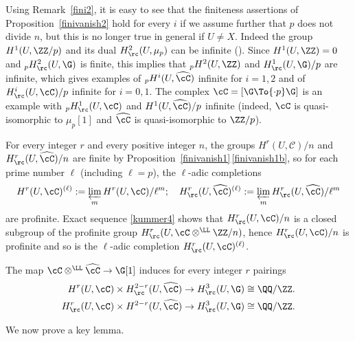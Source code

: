 \begin{rema} \label{nocofini}
Using Remark~\ref{fini2}, it is easy to see that the finiteness
assertions of Proposition~\ref{finivanish2} hold for every $i$ if we assume
further that $p$ does not divide $n$, but this is no longer true
in general if $U \neq X$.
Indeed the group $H^1(U,\ZZ/p)$ and its dual $H^2_\rc(U,\mu_p)$
can be infinite (\cf \cite[Lem.\,III.8.9]{MilADT}).
Since $H^1(U,\ZZ)=0$ and $_p H^2_\rc(U,\G)$ is finite,
this implies that $_p H^2(U,\ZZ)$ and $H^1_\rc(U,\G)/p$ are infinite, which gives
examples of $_p H^i(U, \widehat \cC)$ infinite for $i=1,2$ and of
$H^i_\rc(U,\cC)/p$ infinite for $i=0,1$. The complex
$\cC=[\G \To{\cdot p} \G]$ is an example with $_p H^1_\rc(U,\cC)$
and $H^1(U,\widehat \cC)/p$ infinite (indeed, $\cC$ is quasi-isomorphic
to $\mu_p[1]$ and $\widehat \cC$ is quasi-isomorphic to $\ZZ/p$).
\end{rema}

\begin{rema}
For every integer $r$ and every positive integer $n$,
the groups $H^r(U, \mathcal C)/n$ and
$H^r_\rc(U,\widehat \cC)/n$ are finite by
Proposition~\ref{finivanish1}\,\eqref{finivanish1b}, so for each prime number
$\ell$ (including $\ell=p$), the $\ell$-adic completions
\[
H^r(U,\cC)^{(\ell)}:=\varprojlim_m
H^r(U,\cC)/\ell^m; \quad
H^r_\rc(U,\widehat \cC)^{(\ell)}:=\varprojlim_m
H^r_\rc(U,\widehat \cC)/\ell^m
\]
are profinite. Exact sequence \eqref{kummer4}
shows that $H^r_\rc(U,\cC)/n$ is a closed subgroup
of the profinite group $H^r_\rc(U,\cC \otimes^\LL \ZZ/n)$,
hence $H^r_\rc(U,\cC)/n$ is profinite and so is the
$\ell$-adic completion $H^r_\rc(U,\cC)^{(\ell)}$.
\end{rema}

The map $\cC \otimes^\LL \widehat \cC \to \G[1]$
induces for every integer $r$ pairings
\begin{align} \label{leftpairing}
H^r(U, \cC) \times H^{2-r}_\rc(U,\widehat \cC) &\to
H^3_\rc(U,\G) \cong \QQ/\ZZ.
\\ \label{rightpairing}
H^r_\rc(U, \cC) \times H^{2-r}(U,\widehat \cC) &\to
H^3_\rc(U,\G) \cong \QQ/\ZZ.
\end{align}

We now prove a key lemma.

